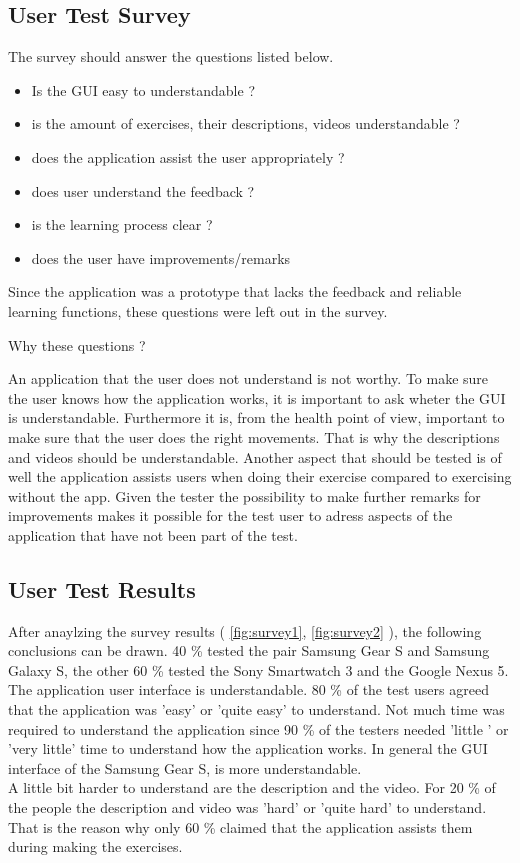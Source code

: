 \subsection{User Test Survey}
The survey should answer the questions listed below.
\begin{itemize}
\item Is the GUI easy to understandable ?
\item is the amount of exercises, their descriptions, videos understandable ?
\item does the application assist the user appropriately ?
\item does user understand the feedback ?
\item is the learning process clear ?
\item does the user have improvements/remarks
\end{itemize}
Since the application was a prototype that lacks the feedback and reliable learning functions, these questions were left out in the survey.\\
\newline
\begin{Large}
Why these questions ?\\

\end{Large}
An application that the user does not understand is not worthy. To make sure the user knows how the application works, it is important to ask wheter the GUI is understandable.
Furthermore it is, from the health point of view, important to make sure that the user does the right movements. That is why the descriptions and videos should be understandable. Another aspect that should be tested is of well the application assists users when doing their exercise compared to exercising without the app.
Given the tester the possibility to make further remarks for improvements makes it possible for the test user to adress aspects of the application that have not been part of the test.

\subsection{User Test Results}

After anaylzing the survey results ( \ref{fig:survey1}, \ref{fig:survey2} ), the following conclusions can be drawn. 40 \% tested the pair Samsung Gear S and Samsung Galaxy S, the other 60 \% tested the Sony Smartwatch 3 and the Google Nexus 5.
\\
The application user interface is understandable. 80 \% of the test users agreed that the application was 'easy' or 'quite easy' to understand. Not much time was required to understand the application since 90 \% of the testers needed 'little ' or 'very little' time to understand how the application works. In general the GUI interface of the Samsung Gear S, is more understandable.\\
A little bit harder to understand are the description and the video. For 20 \% of the people the description and video was 'hard' or 'quite hard' to understand. That is the reason why only 60 \% claimed that the application assists them during making the exercises.
